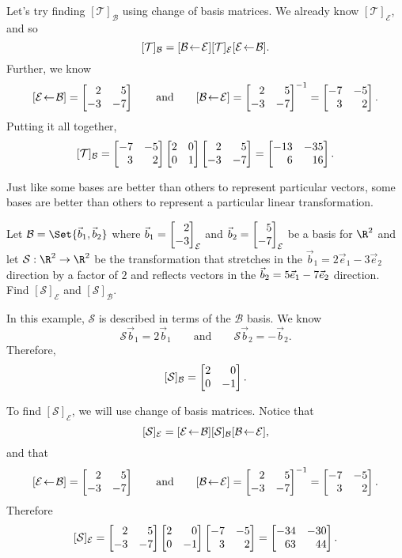 \begin{example}
	Let's try finding $[\mathcal T]_{\mathcal B}$ using change of basis matrices. We already know $[\mathcal T]_{\mathcal E}$, and so
	\[
		[\mathcal T]_{\mathcal B} = \BasisChange{\mathcal E}{\mathcal B}[\mathcal T]_{\mathcal E}\BasisChange{\mathcal B}{\mathcal E}.
	\]
	Further, we know
	\[
		\BasisChange{\mathcal B}{\mathcal E}=\mat{2&5\\-3&-7}\qquad \text{and}\qquad
		\BasisChange{\mathcal E}{\mathcal B}=\mat{2&5\\-3&-7}^{-1}=\mat{-7&-5\\3&2}.
	\]
	Putting it all together,
	\[
		[\mathcal T]_{\mathcal B}=\mat{-7&-5\\3&2}\mat{2&0\\0&1}\mat{2&5\\-3&-7} = \mat{-13&-35\\6&16}.
	\]

\end{example}


Just like some bases are better than others to represent particular vectors, some bases are better than others
to represent a particular linear transformation.

\begin{example}
	Let $\mathcal B=\Set{\vec b_1,\vec b_2}$ where $\vec b_1=\mat{2\\-3}_{\mathcal E}$ and $\vec b_2=\mat{5\\-7}_{\mathcal E}$
	be a basis for $\R^2$ and let $\mathcal S:\R^2\to\R^2$ be the transformation that stretches in the $\vec b_1=2\vec e_1-3\vec e_2$ direction 
	by a factor of $2$ and reflects vectors in the $\vec b_2=5\xhat-7\yhat$ direction. 
	Find $[\mathcal S]_{\mathcal E}$ and $[\mathcal S]_{\mathcal B}$.

	In this example, $\mathcal S$ is described in terms of the $\mathcal B$ basis. We know
	\[
		\mathcal S\vec b_1=2\vec b_1\qquad\text{and}\qquad\mathcal S\vec b_2=-\vec b_2.
	\]
	Therefore,
	\[
		[\mathcal S]_{\mathcal B}=\mat{2&0\\0&-1}.
	\]

	To find $[\mathcal S]_{\mathcal E}$, we will use change of basis matrices. Notice that
	\[
		[\mathcal S]_{\mathcal E} = \BasisChange{\mathcal B}{\mathcal E}[\mathcal S]_{\mathcal B}\BasisChange{\mathcal E}{\mathcal B},
	\]
	and that
	\[
		\BasisChange{\mathcal B}{\mathcal E}=\mat{2&5\\-3&-7}\qquad \text{and}\qquad
		\BasisChange{\mathcal E}{\mathcal B}=\mat{2&5\\-3&-7}^{-1}=\mat{-7&-5\\3&2}.
	\]
	Therefore
	\[
		[\mathcal S]_{\mathcal E} = \mat{2&5\\-3&-7}\mat{2&0\\0&-1}\mat{-7&-5\\3&2}=\mat{-34&-30\\63&44}.
	\]
\end{example}


